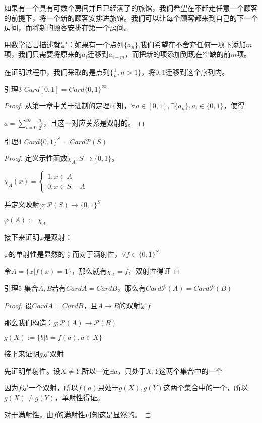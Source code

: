 \documentclass[12pt, a4paper, oneside, UTF8]{ctexbook}
\begin{document}
			如果有一个具有可数个房间并且已经满了的旅馆，我们希望在不赶走任意一个顾客的前提下，将一个新的顾客安排进旅馆。我们可以让每个顾客都来到自己的下一个房间，而将新的顾客安排在第一个房间。
			
			用数学语言描述就是：如果有一个点列$\{a_n\}$,我们希望在不舍弃任何一项下添加$m$项，我们只需要将原来的$a_i$迁移到$a_{i+m}$，而把新的项添加到现在空缺的前$m$项。
			
			在证明过程中，我们采取的是点列$\{\frac{1}{n},n>1\}$，将$0,1$迁移到这个序列内。
			\begin{lemma}{引理3}{}
				$Card [0,1] = Card \{0,1\}^\infty$
			\end{lemma}
			\begin{proof}
				从第一章中关于进制的定理可知，$\forall a \in [0,1],\exists \{a_n\},a_i \in \{0,1\}$，使得
				
				$a = \sum\limits_{i=0}^{\infty}\frac{a_i}{2^i}$，且这一对应关系是双射的。
			\end{proof}
			\begin{lemma}{引理4}{}
				$Card \{0,1\}^S = Card \mathscr{P}(S)$
			\end{lemma}
			\begin{proof}
				定义示性函数$\chi_A:S\rightarrow\{0,1\}$。
				
				$\chi_A(x) = \begin{cases}
					1,x \in A \\
					0,x \in S-A
				\end{cases}$
				
				并定义映射$\varphi : \mathscr{P}(S)\rightarrow \{0,1\}^S$
				
				$\varphi(A) := \chi_A$
				
				接下来证明$\varphi$是双射：
				
				$\varphi$的单射性是显然的；而对于满射性，$\forall f \in \{0,1\}^S$
				
				令$A = \{x|f(x)=1\}$，那么就有$\chi_A=f$，双射性得证
			\end{proof}
			\begin{lemma}{引理5}
				集合$A,B$若有$Card A = Card B$，那么有$Card \mathscr{P}(A) = Card \mathscr{P}(B)$
			\end{lemma}
			\begin{proof}
				设$Card A=Card B$，且$A\rightarrow B$的双射是$f$
				
				那么我们构造：$g:\mathscr{P}(A)\rightarrow\mathscr{P}(B)$
				
				$g(X) := \{b|b=f(a),a\in X\}$
				
				接下来证明$g$是双射
				
				先证明单射性。设$X\neq Y$,所以一定$\exists a$，只处于$X,Y$这两个集合中的一个
				
				因为$f$是一个双射，所以$f(a)$只处于$g(X),g(Y)$这两个集合中的一个，所以$g(X)\neq g(Y)$，单射性得证。
				
				对于满射性，由$f$的满射性可知这是显然的。
			\end{proof}
\end{document}
